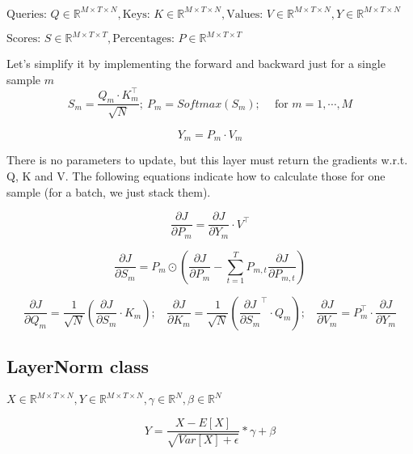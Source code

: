 \documentclass{../../../extra/aakpract/aakpract}
\begin{document}
$\text{Queries: } Q \in \mathbb{R}^{M \times T \times N},  \text{Keys: } K \in \mathbb{R}^{M \times T \times N},  \text{Values: } V \in \mathbb{R}^{M \times T \times N}, Y \in \mathbb{R}^{M \times T \times N}$

$\text{Scores: } S \in \mathbb{R}^{M \times T \times T},  \text{Percentages: } P \in \mathbb{R}^{M \times T \times T}$

Let's simplify it by implementing the forward and backward just for a single sample $m$
\begin{equation}
	S_m = \frac{Q_m \cdot K_m^\top}{\sqrt{N}};\ P_m = Softmax(S_m);\ \ \ \ \text{ for } m = 1, \cdots, M
\end{equation}

\begin{equation}
	Y_m = P_m \cdot V_m
\end{equation}

There is no parameters to update, but this layer must return the gradients w.r.t. Q, K and V.
The following equations indicate how to calculate those for one sample (for a batch, we just stack them).

\begin{equation}
	\frac{\partial J}{\partial P_{m}} = \frac{\partial J}{\partial Y_{m}} \cdot V^\top
\end{equation}

\begin{equation}
	\frac{\partial J}{\partial S_{m}} = P_m \odot (\frac{\partial J}{\partial P_{m}} - \sum_{t=1}^{T} P_{m, t} \frac{\partial J}{\partial P_{m, t}})
\end{equation}

\begin{equation}
	\frac{\partial J}{\partial Q_{m}} = \frac{1}{\sqrt{N}} (\frac{\partial J}{\partial S_{m}} \cdot K_m);
	\ \ \ \
	\frac{\partial J}{\partial K_{m}} = \frac{1}{\sqrt{N}} (\frac{\partial J}{\partial S_{m}}^\top \cdot Q_m);
	\ \ \ \
	\frac{\partial J}{\partial V_{m}} = P_m^\top \cdot \frac{\partial J}{\partial Y_{m}}
\end{equation}


\subsection{LayerNorm class}

$X \in \mathbb{R}^{M \times T \times N}, Y \in \mathbb{R}^{M \times T \times N}, \gamma\in \mathbb{R}^{N}, \beta \in \mathbb{R}^{N}$

\begin{equation}
	Y = \frac{X - E[X]}{\sqrt{Var[X] + \epsilon}} * \gamma + \beta
\end{equation}
\end{document}
